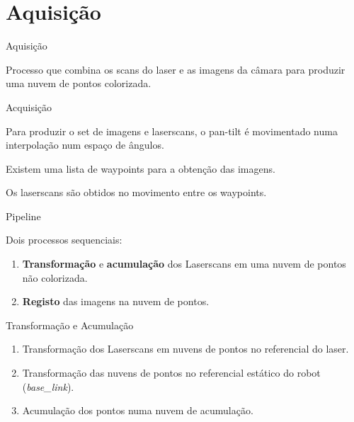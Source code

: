 \section{Aquisição}

\begin{frame}{Aquisição}

    Processo que combina os scans do laser e as imagens da câmara para produzir uma nuvem de pontos colorizada.

\end{frame}

\begin{frame}{Acquisição}

    Para produzir o set de imagens e laserscans, o pan-tilt é movimentado numa interpolação num espaço de ângulos.

    Existem uma lista de waypoints para a obtenção das imagens.

    Os laserscans são obtidos no movimento entre os waypoints.

\end{frame}

\begin{frame}{Pipeline}
    
    Dois processos sequenciais:

    \begin{enumerate}
        \item \textbf{Transformação} e \textbf{acumulação} dos Laserscans em uma nuvem de pontos não colorizada.
        \item \textbf{Registo} das imagens na nuvem de pontos.
    \end{enumerate}

\end{frame}

\begin{frame}{Transformação e Acumulação}
        
    \begin{enumerate}
        \item<1-> Transformação dos Laserscans em nuvens de pontos no referencial do laser.
        \item<2-> Transformação das nuvens de pontos no referencial estático do robot (\textit{base\_link}).
        \item<3-> Acumulação dos pontos numa nuvem de acumulação.
    \end{enumerate}

\end{frame}


